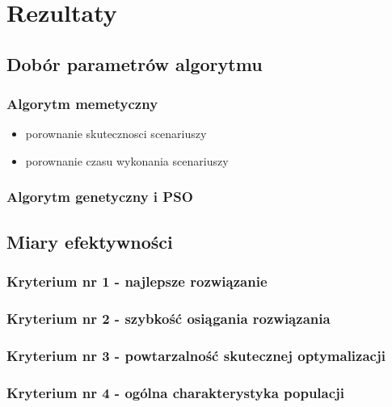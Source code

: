 \chapter{Rezultaty}
\section{Dobór parametrów algorytmu}
\subsection{Algorytm memetyczny}
\begin{itemize}
\item porownanie skutecznosci scenariuszy
\item porownanie czasu wykonania scenariuszy
\end{itemize}
\subsection{Algorytm genetyczny i PSO}
\section{Miary efektywności}
\subsection{Kryterium nr 1 - najlepsze rozwiązanie}
\subsection{Kryterium nr 2 - szybkość osiągania rozwiązania}
\subsection{Kryterium nr 3 - powtarzalność skutecznej optymalizacji}
\subsection{Kryterium nr 4 - ogólna charakterystyka populacji}